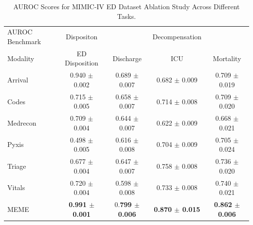 \documentclass[pmlr]{jmlr}%
\begin{document}
\begin{table}[H]
\caption{AUROC Scores for MIMIC-IV ED Dataset Ablation Study Across Different Tasks.
}
\label{r5}
\begin{adjustbox}{width=\textwidth}
\begin{small}
\begin{tabular}{l|c|ccc}
\toprule
AUROC Benchmark & Dispositon & & Decompensation &\\
Modality & ED Disposition & Discharge & ICU & Mortality \\
\midrule
Arrival & 0.940 $\pm$ 0.002 & 0.689 $\pm$ 0.007 & 0.682 $\pm$ 0.009 & 0.709 $\pm$ 0.019 \\
Codes & 0.715 $\pm$ 0.005 & 0.658 $\pm$ 0.007 & 0.714 $\pm$ 0.008 & 0.709 $\pm$ 0.020 \\
Medrecon & 0.709 $\pm$ 0.004 & 0.644 $\pm$ 0.007 & 0.622 $\pm$ 0.009 & 0.668 $\pm$ 0.021 \\
Pyxis & 0.498 $\pm$ 0.005 & 0.616 $\pm$ 0.008 & 0.704 $\pm$ 0.009 & 0.705 $\pm$ 0.024 \\
Triage & 0.677 $\pm$ 0.004 & 0.647 $\pm$ 0.007 & 0.758 $\pm$ 0.008 & 0.736 $\pm$ 0.020 \\
Vitals & 0.720 $\pm$ 0.004 & 0.598 $\pm$ 0.008 & 0.733 $\pm$ 0.008 & 0.740 $\pm$ 0.021 \\
MEME & \textbf{0.991 $\pm$ 0.001} & 0.\textbf{799 $\pm$ 0.006} & \textbf{0.870 $\pm$ 0.015} & \textbf{0.862 $\pm$ 0.006} \\
\bottomrule
\end{tabular}
\end{small}
\end{adjustbox}
\end{table}
\end{document}
